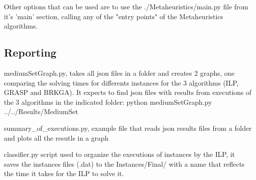 Other options that can be used are to use the ./Metaheuristics/main.py file from it's 'main' section, calling any of the "entry points" of the Metaheuristics algorithms.

\subsection{Reporting}

mediumSetGraph.py, takes all json files in a folder and creates 2 graphs, one comparing the solving times for differents instances for the 3 algorithms (ILP, GRASP and BRKGA). It expects to find json files with results from executions of the 3 algorithms in the indicated folder: python mediumSetGraph.py ../../Results/MediumSet

summary\_of\_executions.py, example file that reads json results files from a folder and plots all the resutls in a graph

classifier.py script used to organize the executions of instances by the ILP, it saves the instances files (.dat) to the Instances/Final/ with a name that reflects the time it takes for the ILP to solve it.